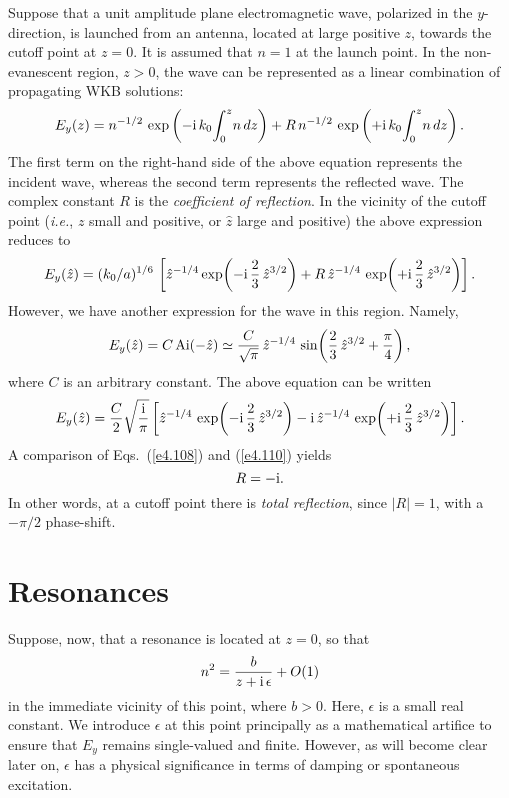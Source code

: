 Suppose that a unit amplitude plane electromagnetic wave, polarized in the
$y$-direction,   is launched
from an antenna, located at large positive $z$,  towards the cutoff point at $z=0$.
It is assumed that $n=1$ at the launch point. 
In the non-evanescent region, $z>0$,  the wave can be
represented as a linear combination
of propagating WKB solutions:
\begin{equation}
E_y(z) = n^{-1/2}\,\exp\left(- {\rm i}\, k_0 \!\int_0^z \!n\,dz\right)
+ R\,n^{-1/2}\,\exp\left(+{\rm i}\, k_0 \!\int_0^z \!n\,dz\right).
\end{equation}
The first term on the right-hand side of the above equation represents the
incident wave, whereas the second term represents the reflected wave. 
The complex constant $R$ is the {\em coefficient of reflection}. 
In the vicinity of the cutoff point ({\em i.e.}, $z$ small and positive,
or $\hat{z}$ large and positive)
the above expression reduces to
\begin{equation}\label{e4.108}
E_y(\hat{z}) = (k_0/a)^{1/6}\,\left[
\hat{z}^{-1/4}\exp\!\left(-{\rm i}\,\frac{2}{3}\,\hat{z}^{3/2}\right)
+ R\,\hat{z}^{-1/4}\,\exp\!\left(+{\rm i}\,\frac{2}{3}\,\hat{z}^{3/2}\right)
\right].
\end{equation}
However, we  have another expression for the wave in this region. Namely,
\begin{equation}
E_y(\hat{z}) = C\,{\rm Ai}(-\hat{z}) \simeq \frac{C}{\sqrt{\pi}}\, \hat{z}^{-1/4}\,\sin\!
\left(\frac{2}{3}\,\hat{z}^{3/2}+\frac{\pi}{4}\right),
\end{equation}
where $C$ is an arbitrary constant. 
The above equation can be written
\begin{equation}\label{e4.110}
E_y(\hat{z}) =\frac{C}{2}\sqrt{\frac{{\rm i}}{\pi}}
\left[\hat{z}^{-1/4}\,\exp\!\left(-{\rm i}\,\frac{2}{3}\,\hat{z}^{3/2}\right)
-{\rm i}\,\hat{z}^{-1/4}\,\exp\!\left(+{\rm i}\,\frac{2}{3}\,\hat{z}^{3/2}\right)
\right].
\end{equation}
A comparison of Eqs.~(\ref{e4.108}) and (\ref{e4.110}) yields
\begin{equation}
R = -{\rm i}.
\end{equation}
In other words, at a cutoff point there is {\em total reflection}, since
$|R|=1$, with a $-\pi/2$ phase-shift. 

\section{Resonances}
Suppose, now, that a resonance is located at $z=0$, so that
\begin{equation}\label{e4.112}
n^2 = \frac{b}{z + {\rm i}\,\epsilon} +O(1)
\end{equation}
in the immediate vicinity of this point, where $b>0$. Here, $\epsilon$
is a small real constant. We introduce $\epsilon$ at this point principally
as a mathematical artifice to ensure that $E_y$ remains single-valued and
finite. However, as will become clear later on, $\epsilon$ has a physical significance
in terms of damping or spontaneous excitation. 

